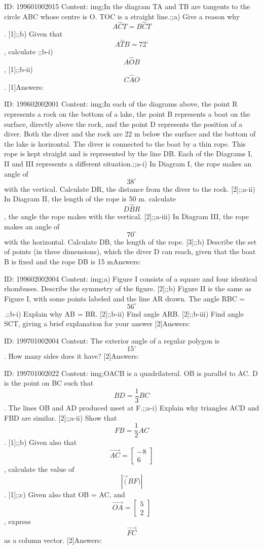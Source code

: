 \documentclass{article}
\begin{document}
ID: 199601002015
Content:
img;In the diagram TA and TB are tangents to the circle ABC whose centre is O. TOC is a straight line.;;a) Give a reason why $$A \hat CT = B \hat CT$$. [1];;b) Given that $$A \hat TB = 72^{\circ}$$, calculate ;;b-i) $$A \hat OB$$, [1];;b-ii) $$C \hat AO$$. [1]Answers:

ID: 199602002001
Content:
img;In each of the diagrams above, the point R represents a rock on the bottom of a lake, the point B represents a boat on the surface, directly above the rock, and the point D represents the position of a diver. Both the diver and the rock are 22 m below the surface and the bottom of the lake is horizontal. The diver is connected to the boat by a thin rope. This rope is kept straight and is represented by the line DB. Each of the Diagrams I, II and III represents a different situation.;;a-i) In Diagram I, the rope makes an angle of $$38^{\circ}$$ with the vertical. Calculate DR,	the distance from the diver to the rock. [2];;a-ii) In Diagram II, the length of the rope is 50 m. calculate $$D \hat BR$$, the angle the rope makes with the vertical. [2];;a-iii) In Diagram III, the rope makes an angle of $$70^{\circ}$$ with the horizontal. Calculate DB, the length of the rope. [3];;b) Describe the set of points (in three dimensions), which the diver D can reach, given that the boat B is fixed and the rope DB is 15 mAnswers:

ID: 199602002004
Content:
img;a) Figure I consists of a square and four identical rhombuses. Describe the symmetry of the figure. [2];;b) Figure II is the same as Figure I, with some points labeled and the line AR drawn. The angle RBC = $$56^{\circ}$$.;;b-i) Explain why AB = BR. [2];;b-ii) Find angle ARB. [2];;b-iii) Find angle SCT, giving a brief explanation for your answer [2]Answers:

ID: 199701002004
Content:
The exterior angle of a regular polygon is $$15^{\circ}$$. How many sides does it have? [2]Answers:

ID: 199701002022
Content:
img;OACB is a quadrilateral. OB is parallel to AC. D is the point on BC such that $$BD=\frac{1}{3}BC$$. The lines OB and AD produced meet at F.;;a-i) Explain why triangles ACD and FBD are similar. [2];;a-ii) Show that $$FB=\frac{1}{2}AC$$. [1];;b) Given also that $$\vec{AC}=\begin{bmatrix}-8\\6\end{bmatrix}$$, calculate the value of $$|\vec(BF)|$$. [1];;c) Given also that OB = AC, and $$\vec{OA}=\begin{bmatrix}5\\2\end{bmatrix}$$, express $$\vec{FC}$$ as a column vector. [2]Answers:
\end{document}

